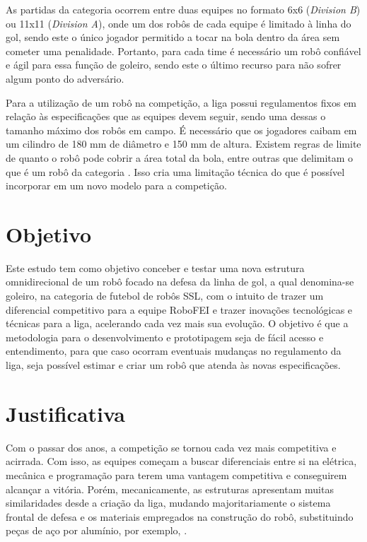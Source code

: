 \documentclass[deposito, acronym, symbols]{fei}
\begin{document}
As partidas da categoria ocorrem entre duas equipes no formato 6x6 (\textit{Division B}) ou 11x11 (\textit{Division A}), onde um dos robôs de cada equipe é limitado à linha do gol, sendo este o único jogador permitido a tocar na bola dentro da área sem cometer uma penalidade. Portanto, para cada time é necessário um robô confiável e ágil para essa função de goleiro, sendo este o último recurso para não sofrer algum ponto do adversário.

Para a utilização de um robô na competição, a liga possui regulamentos fixos em relação às especificações que as equipes devem seguir, sendo uma dessas o tamanho máximo dos robôs em campo. É necessário que os jogadores caibam em um cilindro de 180 mm de diâmetro e 150 mm de altura. Existem regras de limite de quanto o robô pode cobrir a área total da bola, entre outras que delimitam o que é um robô da categoria \cite{rules}. Isso cria uma limitação técnica do que é possível incorporar em um novo modelo para a competição. 

\section{Objetivo}

Este estudo tem como objetivo conceber e testar uma nova estrutura omnidirecional de um robô focado na defesa da linha de gol, a qual denomina-se goleiro, na categoria de futebol de robôs SSL, com o intuito de trazer um diferencial competitivo para a equipe RoboFEI e trazer inovações tecnológicas e técnicas para a liga, acelerando cada vez mais sua evolução. O objetivo é que a metodologia para o desenvolvimento e prototipagem seja de fácil acesso e entendimento, para que caso ocorram eventuais mudanças no regulamento da liga, seja possível estimar e criar um robô que atenda às novas especificações.

\section{Justificativa}

Com o passar dos anos, a competição se tornou cada vez mais competitiva e acirrada. Com isso, as equipes começam a buscar diferenciais entre si na elétrica, mecânica e programação para terem uma vantagem competitiva e conseguirem alcançar a vitória. Porém, mecanicamente, as estruturas apresentam muitas similaridades desde a criação da liga, mudando majoritariamente o sistema frontal de defesa e os materiais empregados na construção do robô, substituindo peças de aço por alumínio, por exemplo, \cite{robofei2012}.
\end{document}
